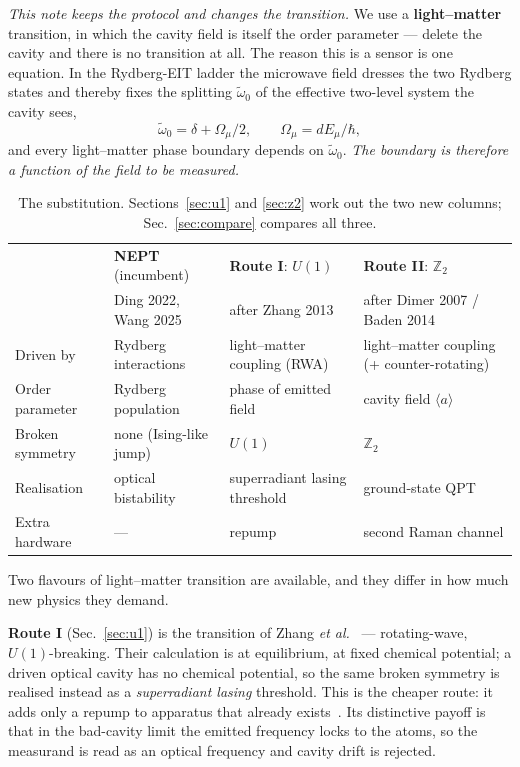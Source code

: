 \documentclass[11pt,a4paper]{article}
\newcommand{\Omu}{\Omega_{\mu}}
\newcommand{\wt}{\tilde{\omega}_{0}}
\newcommand{\avg}[1]{\langle #1 \rangle}
\begin{document}
\emph{This note keeps the protocol and changes the transition.} We use a \textbf{light--matter}
transition, in which the cavity field is itself the order parameter --- delete the cavity and
there is no transition at all. The reason this is a sensor is one equation. In the
Rydberg-EIT ladder the microwave field dresses the two Rydberg states and thereby fixes the
splitting $\wt$ of the effective two-level system the cavity sees,
\begin{equation}
  \wt = \delta + \Omu/2, \qquad \Omu = dE_\mu/\hbar,
  \label{eq:key}
\end{equation}
and every light--matter phase boundary depends on $\wt$. \emph{The boundary is therefore a
function of the field to be measured.}

\begin{table}[h]
\centering\small
\begin{tabular}{@{}p{3.1cm} p{3.7cm} p{3.5cm} p{4.3cm}@{}}
\toprule
& \textbf{NEPT} (incumbent) & \textbf{Route I}: $U(1)$ & \textbf{Route II}: $\mathbb{Z}_2$ \\
& Ding 2022, Wang 2025 & after Zhang 2013 & after Dimer 2007 / Baden 2014\\
\midrule
Driven by & Rydberg interactions & light--matter coupling (RWA) & light--matter coupling (+ counter-rotating)\\
Order parameter & Rydberg population & phase of emitted field & cavity field $\avg{a}$\\
Broken symmetry & none (Ising-like jump) & $U(1)$ & $\mathbb{Z}_2$\\
Realisation & optical bistability & superradiant lasing threshold & ground-state QPT\\
Extra hardware & --- & repump & second Raman channel\\
\bottomrule
\end{tabular}
\caption{The substitution. Sections~\ref{sec:u1} and \ref{sec:z2} work out the two new
columns; Sec.~\ref{sec:compare} compares all three.}
\label{tab:three}
\end{table}

Two flavours of light--matter transition are available, and they differ in how much new
physics they demand.

\textbf{Route I} (Sec.~\ref{sec:u1}) is the transition of Zhang \emph{et al.}~\cite{Zhang2013}
--- rotating-wave, $U(1)$-breaking. Their calculation is at equilibrium, at fixed chemical
potential; a driven optical cavity has no chemical potential, so the same broken symmetry is
realised instead as a \emph{superradiant lasing} threshold. This is the cheaper route: it adds
only a repump to apparatus that already exists~\cite{CavitySuperhet2025}. Its distinctive
payoff is that in the bad-cavity limit the emitted frequency locks to the atoms, so the
measurand is read as an optical frequency and cavity drift is rejected.
\end{document}
